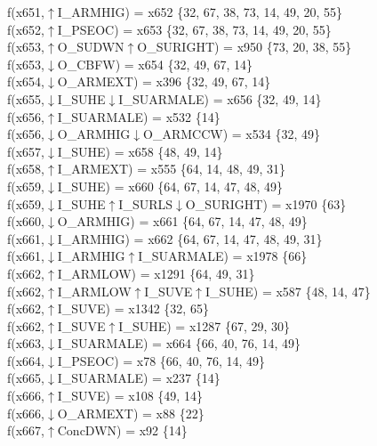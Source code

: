 f(x651,$\uparrow$I\_ARMHIG) = x652 \{32, 67, 38, 73, 14, 49, 20, 55\} \\  
f(x652,$\uparrow$I\_PSEOC) = x653 \{32, 67, 38, 73, 14, 49, 20, 55\} \\  
f(x653,$\uparrow$O\_SUDWN$\uparrow$O\_SURIGHT) = x950 \{73, 20, 38, 55\} \\  
f(x653,$\downarrow$O\_CBFW) = x654 \{32, 49, 67, 14\} \\  
f(x654,$\downarrow$O\_ARMEXT) = x396 \{32, 49, 67, 14\} \\  
f(x655,$\downarrow$I\_SUHE$\downarrow$I\_SUARMALE) = x656 \{32, 49, 14\} \\  
f(x656,$\uparrow$I\_SUARMALE) = x532 \{14\} \\  
f(x656,$\downarrow$O\_ARMHIG$\downarrow$O\_ARMCCW) = x534 \{32, 49\} \\  
f(x657,$\downarrow$I\_SUHE) = x658 \{48, 49, 14\} \\  
f(x658,$\uparrow$I\_ARMEXT) = x555 \{64, 14, 48, 49, 31\} \\  
f(x659,$\downarrow$I\_SUHE) = x660 \{64, 67, 14, 47, 48, 49\} \\  
f(x659,$\downarrow$I\_SUHE$\uparrow$I\_SURLS$\downarrow$O\_SURIGHT) = x1970 \{63\} \\  
f(x660,$\downarrow$O\_ARMHIG) = x661 \{64, 67, 14, 47, 48, 49\} \\  
f(x661,$\downarrow$I\_ARMHIG) = x662 \{64, 67, 14, 47, 48, 49, 31\} \\  
f(x661,$\downarrow$I\_ARMHIG$\uparrow$I\_SUARMALE) = x1978 \{66\} \\  
f(x662,$\uparrow$I\_ARMLOW) = x1291 \{64, 49, 31\} \\  
f(x662,$\uparrow$I\_ARMLOW$\uparrow$I\_SUVE$\uparrow$I\_SUHE) = x587 \{48, 14, 47\} \\  
f(x662,$\uparrow$I\_SUVE) = x1342 \{32, 65\} \\  
f(x662,$\uparrow$I\_SUVE$\uparrow$I\_SUHE) = x1287 \{67, 29, 30\} \\  
f(x663,$\downarrow$I\_SUARMALE) = x664 \{66, 40, 76, 14, 49\} \\  
f(x664,$\downarrow$I\_PSEOC) = x78 \{66, 40, 76, 14, 49\} \\  
f(x665,$\downarrow$I\_SUARMALE) = x237 \{14\} \\  
f(x666,$\uparrow$I\_SUVE) = x108 \{49, 14\} \\  
f(x666,$\downarrow$O\_ARMEXT) = x88 \{22\} \\  
f(x667,$\uparrow$ConcDWN) = x92 \{14\} \\  
